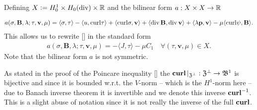 \documentclass[../master_thesis.tex]{subfiles}
\begin{document}
Defining $X \vcentcolon= H^1_0 \times H_0(\operatorname{div}) \times \mathbb{R}$ and the 
bilinear form $a:X\times X \rightarrow \mathbb{R}$

\begin{align*}
    a(\sigma,\mathbf{B}, \lambda;\tau,\mathbf{v},\mu) 
    =   \langle \sigma, \tau \rangle - \langle u, \mathbf{\operatorname{curl}}\tau \rangle
        + \langle \mathbf{\operatorname{curl}}\sigma, \mathbf{v} \rangle + \langle \operatorname{div} \mathbf{B}, \operatorname{div} \mathbf{v} \rangle 
        + \langle \lambda \mathbf{p}, \mathbf{v} \rangle - \mu \langle \mathbf{\operatorname{curl}} \psi, \mathbf{B} \rangle.
\end{align*}
This allows us to rewrite \ref{} in the standard form
\begin{align*}
    a(\sigma,\mathbf{B},\lambda;\tau,\mathbf{v},\mu) = -\langle J, \tau \rangle - \mu C_1
        \quad \forall (\tau,\mathbf{v},\mu) \in X.
\end{align*}
Note that the bilinear form $a$ is not symmetric. 

As stated in the proof of the Poincare inequality \ref{} 
the $\veccurl| _{\mathfrak{Z}^\perp}: \mathfrak{Z}^\perp \rightarrow \mathfrak{B}^1$
is bijective and since it is bounded w.r.t. the $V$-norm -- which is the 
$H^1$-norm here -- due to Banach inverse theorem it is invertible and we denote this 
inverse $\veccurl^{-1}$. This is a slight abuse of notation since it is not really 
the inverse of the full $\veccurl$.
\end{document}
